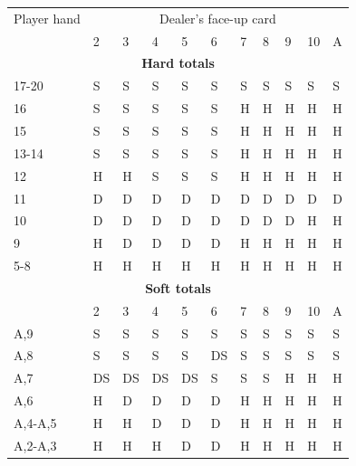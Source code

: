 \documentclass[conference]{IEEEtran}
\begin{document}
\begin{table}[ht]
\tiny
\centering
\begin{tabular}{|l|l|l|l|l|l|l|l|l|l|l|}
\hline

{Player hand} & \multicolumn{10}{c|}{Dealer's face-up card}     \\ \cline{2-11} 
                             & 2 & 3 & 4 & 5 & 6 & 7 & 8 & 9 & 10 & A \\ \hline
\multicolumn{11}{|c|}{\textbf{Hard totals}}                           \\ \hline
17-20       								 & S & S & S & S & S & S & S & S & S & S  \\ \hline
16                           & S & S & S & S & S & H & H & H & H & H  \\ \hline
15                           & S & S & S & S & S & H & H & H & H & H  \\ \hline
13-14                        & S & S & S & S & S & H & H & H & H & H  \\ \hline
12                           & H & H & S & S & S & H & H & H & H & H  \\ \hline
11                           & D & D & D & D & D & D & D & D & D & D  \\ \hline
10                           & D & D & D & D & D & D & D & D & H & H  \\ \hline
9                            & H & D & D & D & D & H & H & H & H & H  \\ \hline
5-8                          & H & H & H & H & H & H & H & H & H & H  \\ \hline

\multicolumn{11}{|c|}{\textbf{Soft totals}}                           \\ \hline
                             & 2 & 3 & 4 & 5 & 6 & 7 & 8 & 9 & 10 & A \\ \hline
A,9                          & S & S & S & S & S & S & S & S & S & S  \\ \hline
A,8                          & S & S & S & S & DS & S & S & S & S & S  \\ \hline
A,7                          & DS & DS & DS & DS & S & S & S & H & H & H  \\ \hline
A,6                          & H & D & D & D & D & H & H & H & H & H  \\ \hline
A,4-A,5                      & H & H & D & D & D & H & H & H & H & H  \\ \hline
A,2-A,3                      & H & H & H & D & D & H & H & H & H & H  \\ \hline


\end{tabular}
\end{table}
\end{document}

